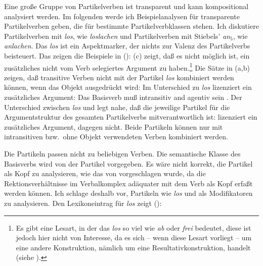 Eine große Gruppe von Partikelverben ist transparent und kann kompositional analysiert
werden. Im folgenden werde ich Beispielanalysen für transparente Partikelverben geben,
die für bestimmte Partikelverbklassen stehen. Ich diskutiere Partikelverben mit \emph{los},
wie \zb \emph{loslachen} und Partikelverben mit Stiebels' \emph{an$_5$}, wie \zb \emph{anlachen}.
Das \emph{los} ist ein Aspektmarker, der nichts zur Valenz des Partikelverbs beisteuert.
Das zeigen die Beispiele in ():
\eal
{}
\zl
(c) zeigt, daß es nicht möglich ist, ein zusätzliches nicht vom Verb
selegiertes Argument zu haben.\footnote{
  Es gibt eine Lesart, in der das \emph{los} so viel wie \emph{ab} oder \emph{frei}
  bedeutet, diese ist jedoch hier nicht von Interesse,
  da es sich -- wenn diese Lesart vorliegt -- um eine andere Konstruktion,
  nämlich um eine Resultativkonstruktion, handelt
  (siehe ).%
}
Die Sätze in (a,b) zeigen, daß transitive Verben nicht mit der Partikel \emph{los}
kombiniert werden können, wenn das Objekt ausgedrückt wird:
\eal
{}
\zl
Im Unterschied zu \emph{los} lizenziert \anf ein zusätzliches Argument:
\eal
{}
\zl
Das Basisverb muß intransitiv and agentiv
sein \citep[]{SW94a}. Der Unterschied zwischen \emph{los} und \anf legt nahe,
daß die jeweilige Partikel für die Argumentstruktur des gesamten Partikelverbs
mitverantwortlich ist: \anf lizenziert ein zusätzliches Argument, \los dagegen nicht.
Beide Partikeln können nur mit intransitiven bzw.\ ohne Objekt verwendeten Verben
kombiniert werden.

Die Partikeln passen nicht zu beliebigen Verben. Die semantische Klasse
des Basisverbs wird von der Partikel vorgegeben. Es wäre nicht korrekt, die Partikel
als Kopf zu analysieren, wie das \zb von \citet[]{Trost91a} vorgeschlagen wurde, 
da die Rektionsverhältnisse im Verbalkomplex adäquater
mit dem Verb als Kopf erfaßt werden können. Ich schlage deshalb vor,
Partikeln wie \emph{los} und \anf als Modifikatoren zu analysieren. Den Lexikoneintrag
für \emph{los} zeigt ():

